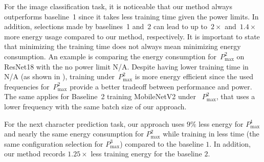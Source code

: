 For the image classification task, it is noticeable that our method always outperforms baseline~1 since it takes less training time given the power limits. In addition, selections made by baselines~1 and~2 can lead to up to~$2\times$ and~$1.4\times$ more energy usage compared to our method, respectively. It is important to state that minimizing the training time does not always mean minimizing energy consumption. An example is comparing the energy consumption for~$P_{\text{max}}^{2}$ on ResNet18 with the no power limit N/A. Despite having lower training time in N/A (as shown in ), training under~$P_{\text{max}}^{2}$ is more energy efficient since the used frequencies for~$P_{\text{max}}^{2}$ provide a better tradeoff between performance and power. The same applies for Baseline~2 training MobileNetV2 under ~$P_{\text{max}}^{2}$, that uses a lower frequency with the same batch size of our approach. 

For the next character prediction task, our approach uses $9\%$ less energy for $P_\text{{max}}^{1}$ and nearly the same energy consumption for $P_\text{{max}}^{2}$ while training in less time (the same configuration selection for $P_\text{{max}}^{3}$) compared to the baseline $1$. In addition, our method records $1.25\times$ less training energy for the baseline $2$.




